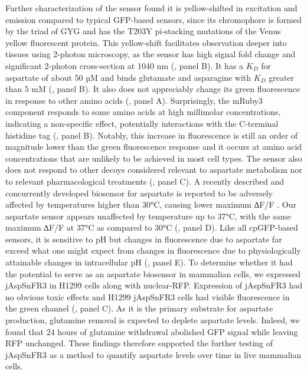 \documentclass[9pt,lineno]{elife}
\begin{document}
Further characterization of the sensor found it is yellow-shifted in excitation and emission compared to typical GFP-based sensors, since its chromophore is formed by the triad of GYG and has the T203Y pi-stacking mutations of the Venus yellow fluorescent protein.
This yellow-shift facilitates observation deeper into tissues using 2-photon microscopy, as the sensor has high signal fold change and significant 2-photon cross-section at 1040 nm (, panel B).
It has a $K_D$ for aspartate of about 50 µM and binds glutamate and asparagine with $K_D$ greater than 5 mM (, panel B).
It also does not appreciably change its green fluorescence in response to other amino acids (, panel A).
Surprisingly, the mRuby3 component responds to some amino acids at high millimolar concentrations, indicating a non-specific effect, potentially interactions with the C-terminal histidine tag (, panel B).
Notably, this increase in fluorescence is still an order of magnitude lower than the green fluorescence response and it occurs at amino acid concentrations that are unlikely to be achieved in most cell types.
The sensor also does not respond to other decoys considered relevant to aspartate metabolism nor to relevant pharmacological treatments (, panel C).
A recently described and concurrently developed biosensor for aspartate is reported to be adversely affected by temperatures higher than 30°C, causing lower maximum ∆F/F \citep{Hellweg2023}.
Our aspartate sensor appears unaffected by temperature up to 37°C, with the same maximum ∆F/F at 37°C as compared to 30°C (, panel D).
Like all cpGFP-based sensors, it is sensitive to pH but changes in fluorescence due to aspartate far exceed what one might expect from changes in fluorescence due to physiologically attainable changes in intracellular pH (, panel E).
To determine whether it had the potential to serve as an aspartate biosensor in mammalian cells, we expressed jAspSnFR3 in H1299 cells along with nuclear-RFP.
Expression of jAspSnFR3 had no obvious toxic effects and H1299 jAspSnFR3 cells had visible fluorescence in the green channel (, panel C).
As it is the primary substrate for aspartate production, glutamine removal is expected to deplete aspartate levels.
Indeed, we found that 24 hours of glutamine withdrawal abolished GFP signal while leaving RFP unchanged.
These findings therefore supported the further testing of jAspSnFR3 as a method to quantify aspartate levels over time in live mammalian cells.
\end{document}
